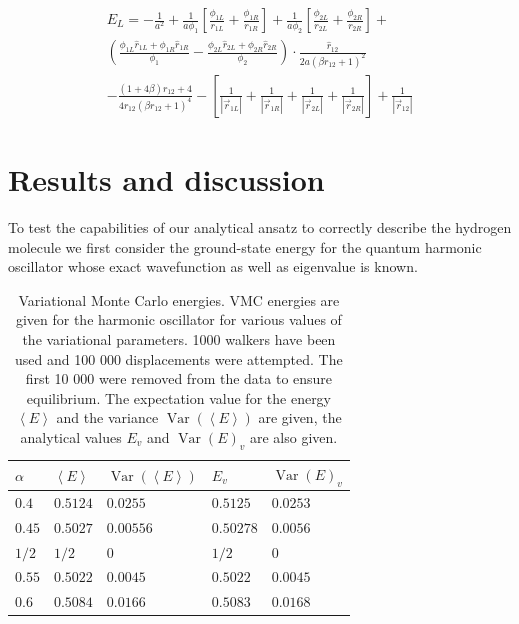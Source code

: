 \documentclass{article}
\begin{document}
 \begin{multline}
 E_L = -\frac{1}{a^2} + \frac{1}{a\phi_1}\left[ \frac{\phi_{1L}}{r_{1L}}+\frac{\phi_{1R}}{r_{1R}} \right] + \frac{1}{a\phi_2} \left[ \frac{\phi_{2L}}{r_{2L}}+\frac{\phi_{2R}}{r_{2R}}\right]
 + \\ \left(  \frac{\phi_{1L}\hat{r}_{1L}+\phi_{1R}\hat{r}_{1R}}{\phi_1}   -    \frac{\phi_{2L}\hat{r}_{2L}+\phi_{2R}\hat{r}_{2R}}{\phi_2}     \right) \cdot \frac{\hat{r}_{12}}{2 a(\beta r_{12}+1)^2} \\
  -   \frac{(1+4 \beta) r_{12} + 4}{4r_{12}(\beta r_{12}+1)^4} 
  - \left[ \frac{1}{|\vec{r}_{1L}|} +\frac{1}{|\vec{r}_{1R}|}+\frac{1}{|\vec{r}_{2L}|}+\frac{1}{|\vec{r}_{2R}|} \right] +\frac{1}{\left| \vec{r}_{12} \right|} 
\end{multline}


\section{Results and discussion}
To test the capabilities of our analytical ansatz to correctly describe the hydrogen molecule we first consider the ground-state energy for the quantum harmonic oscillator whose exact wavefunction as well as eigenvalue is known.

\begin{table}
\caption{Variational Monte Carlo energies. VMC energies are given for the harmonic oscillator for various values of the variational parameters. 1000 walkers have been used and 100 000 displacements were attempted. The first 10 000 were removed from the data to ensure equilibrium. The expectation value for the energy $\left\langle E \right\rangle$ and the variance $\operatorname{Var}(\left\langle E \right\rangle)$ are given, the analytical values $E_v$ and $\operatorname{Var}(E)_v$ are also given.}
\label{table:HO}
\centering
\begin{tabular}{lllll}
\toprule
$\alpha$ & $\left\langle E \right\rangle$ & $\operatorname{Var}(\left\langle E \right\rangle)$ & $E_v$ & $\operatorname{Var}(E)_v$ \\
\midrule
$0.4$  & $0.5124$ & $0.0255$  & $0.5125$  & $0.0253$ \\
$0.45$ & $0.5027$ & $0.00556$ & $0.50278$ & $0.0056$\\
$1/2$  & $1/2$    & 0         & $1/2$     & 0 \\
$0.55$ & $0.5022$ & $0.0045$  & $0.5022$  & $0.0045$\\
$0.6$  & $0.5084$ & $0.0166$  & $0.5083$  & $0.0168$ \\ 
\bottomrule
\end{tabular}
\end{table}
\end{document}
